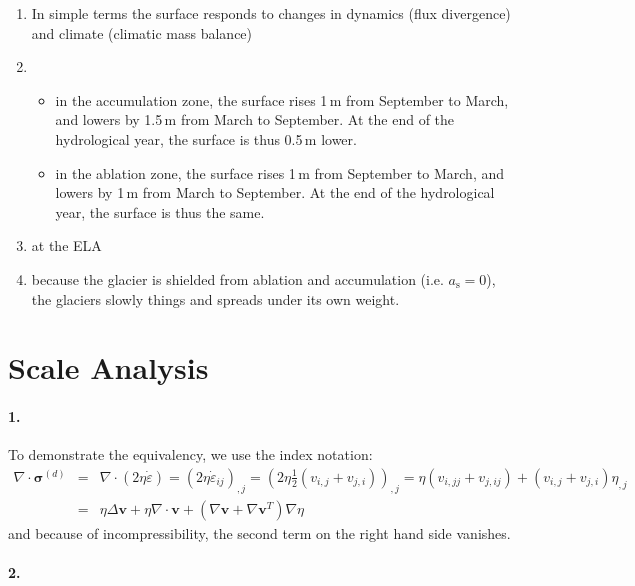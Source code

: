 \documentclass[DIV15,11pt,parskip=half]{scrartcl}
\newcommand{\epsdot}{\dot{\varepsilon}}
\begin{document}
\begin{enumerate}
\item In simple terms the surface responds to changes in dynamics (flux divergence) and climate (climatic mass balance)
\item
\begin{itemize}
\item in the accumulation zone, the surface rises 1\,m from September to March, and lowers by 1.5\,m from March to September. At the end of the hydrological year, the surface is thus 0.5\,m lower.
\item in the ablation zone, the surface rises 1\,m from September to March, and lowers by 1\,m from March to September. At the end of the hydrological year, the surface is thus the same.
\end{itemize}
\item at the ELA
\item because the glacier is shielded from ablation and accumulation (i.e. $a_{\textrm{s}} =0$), the glaciers slowly things and spreads under its own weight.
\end{enumerate}

\section{Scale Analysis}
\paragraph{1.} To demonstrate the equivalency, we use the index notation:
\begin{eqnarray}
  \nabla \cdot \bm{\sigma}^{(d)} &=& \nabla \cdot \left(2 \eta \epsdot\right) =  \left(2 \eta \epsdot_{ij}\right)_{,j} =  \left( 2\eta \frac{1}{2}\left(v_{i,j} + v_{j,i} \right) \right)_{,j} = \eta \left( v_{i,jj} + v_{j,ij}\right) + \left(v_{i,j} + v_{j,i} \right) \eta_{,j} \\
  & = & \eta \Delta \bm{v} + \eta \nabla \cdot \bm{v} + \left(\nabla \bm{v} + \nabla \bm{v}^T \right) \nabla \eta
\end{eqnarray} and because of incompressibility, the second term on the right hand side vanishes.

\paragraph{2.} 
\end{document}
